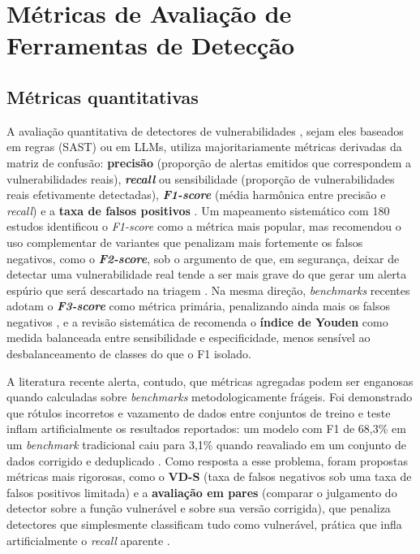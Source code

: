 \section{Métricas de Avaliação de Ferramentas de Detecção}\label{sec:metricas-avaliacao}
\subsection{Métricas quantitativas}\label{subsec:metricas-quantitativas}
A avaliação quantitativa de detectores de vulnerabilidades , sejam eles baseados em regras (SAST) ou em LLMs, utiliza majoritariamente métricas derivadas da matriz de confusão: \textbf{precisão} (proporção de alertas emitidos que correspondem a vulnerabilidades reais), \textbf{\textit{recall}} ou sensibilidade (proporção de vulnerabilidades reais efetivamente detectadas), \textbf{\textit{F1-score}} (média harmônica entre precisão e \textit{recall}) e a \textbf{taxa de falsos positivos} \cite{Kalouptsoglou2023VulnPrediction, Esposito2024SASTComparison}. Um mapeamento sistemático com 180 estudos identificou o \textit{F1-score} como a métrica mais popular, mas recomendou o uso complementar de variantes que penalizam mais fortemente os falsos negativos, como o \textbf{\textit{F2-score}}, sob o argumento de que, em segurança, deixar de detectar uma vulnerabilidade real tende a ser mais grave do que gerar um alerta espúrio que será descartado na triagem \cite{Kalouptsoglou2023VulnPrediction}. Na mesma direção, \textit{benchmarks} recentes adotam o \textbf{\textit{F3-score}} como métrica primária, penalizando ainda mais os falsos negativos \cite{Pellew2026RealVuln}, e a revisão sistemática de  recomenda o \textbf{índice de Youden} como medida balanceada entre sensibilidade e especificidade, menos sensível ao desbalanceamento de classes do que o F1 isolado.

A literatura recente alerta, contudo, que métricas agregadas podem ser enganosas quando calculadas sobre \textit{benchmarks} metodologicamente frágeis. Foi demonstrado que rótulos incorretos e vazamento de dados entre conjuntos de treino e teste inflam artificialmente os resultados reportados: um modelo com F1 de 68,3\% em um \textit{benchmark} tradicional caiu para 3,1\% quando reavaliado em um conjunto de dados corrigido e deduplicado \cite{Ding2025CodeLMVuln}. Como resposta a esse problema, foram propostas métricas mais rigorosas, como o \textbf{VD-S} (taxa de falsos negativos sob uma taxa de falsos positivos limitada) e a \textbf{avaliação em pares} (comparar o julgamento do detector sobre a função vulnerável e sobre sua versão corrigida), que penaliza detectores que simplesmente classificam tudo como vulnerável, prática que infla artificialmente o \textit{recall} aparente \cite{Ding2025CodeLMVuln, Yildiz2025LLMAgents}.


